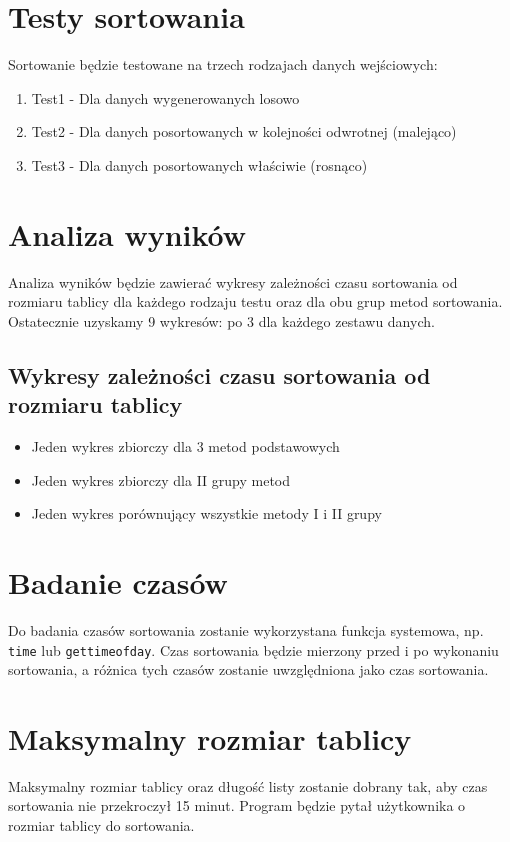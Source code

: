 \documentclass{article}
\begin{document}
\section*{Testy sortowania}
Sortowanie będzie testowane na trzech rodzajach danych wejściowych:
\begin{enumerate}
    \item Test1 - Dla danych wygenerowanych losowo
    \item Test2 - Dla danych posortowanych w kolejności odwrotnej (malejąco)
    \item Test3 - Dla danych posortowanych właściwie (rosnąco)
\end{enumerate}

\section*{Analiza wyników}
Analiza wyników będzie zawierać wykresy zależności czasu sortowania od rozmiaru tablicy dla każdego rodzaju testu oraz dla obu grup metod sortowania. Ostatecznie uzyskamy 9 wykresów: po 3 dla każdego zestawu danych.

\subsection*{Wykresy zależności czasu sortowania od rozmiaru tablicy}
\begin{itemize}
    \item Jeden wykres zbiorczy dla 3 metod podstawowych
    \item Jeden wykres zbiorczy dla II grupy metod
    \item Jeden wykres porównujący wszystkie metody I i II grupy
\end{itemize}

\section*{Badanie czasów}
Do badania czasów sortowania zostanie wykorzystana funkcja systemowa, np. \texttt{time} lub \texttt{gettimeofday}. Czas sortowania będzie mierzony przed i po wykonaniu sortowania, a różnica tych czasów zostanie uwzględniona jako czas sortowania.

\section*{Maksymalny rozmiar tablicy}
Maksymalny rozmiar tablicy oraz długość listy zostanie dobrany tak, aby czas sortowania nie przekroczył 15 minut. Program będzie pytał użytkownika o rozmiar tablicy do sortowania.
\end{document}
